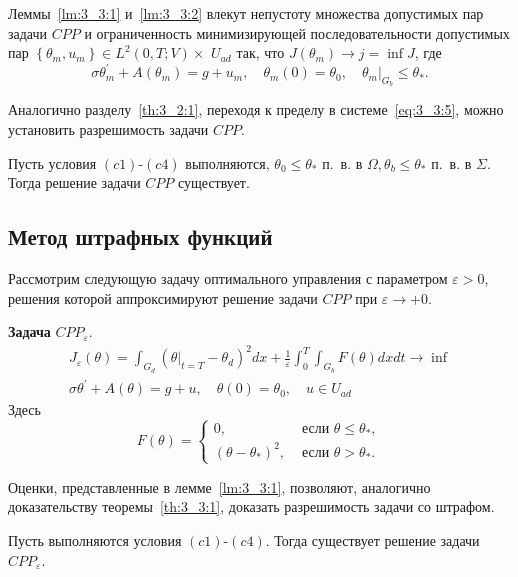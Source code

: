 Леммы~\ref{lm:3_3:1} и~\ref{lm:3_3:2} влекут
непустоту множества допустимых пар задачи $CPP$
и ограниченность минимизирующей последовательности допустимых пар
$\left\{\theta_{m}, u_{m}\right\} \in L^{2}(0, T ; V) \times$
$U_{a d}$ так, что $J\left(\theta_{m}\right) \rightarrow j=\inf J$, где
\begin{equation}
    \label{eq:3_3:5}
    \sigma \theta_{m}^{\prime}+A\left(\theta_{m}\right)=g+u_{m},
    \quad \theta_{m}(0)=\theta_{0},\left.\quad \theta_{m}\right|_{G_{b}} \leq \theta_{*}.
\end{equation}

Аналогично разделу~\ref{th:3_2:1}, переходя к пределу в системе~\eqref{eq:3_3:5},
можно установить разрешимость задачи $CPP$\@.

\begin{theorem}
    \label{th:3_3:1}
    Пусть условия $(c1)$-$(c4)$ выполняются,
    $\theta_{0} \leq \theta_{*}$ п.\ в. в $\Omega, \theta_{b} \leq \theta_{*}$ п.\ в. в $\Sigma$.
    Тогда решение задачи $CPP$ существует.
\end{theorem}

\subsection{Метод штрафных функций}\label{subsec:ch3:sec3:subsec4}
Рассмотрим следующую задачу оптимального управления с параметром $\varepsilon>0$,
решения которой аппроксимируют решение задачи $CPP$ при $\varepsilon \rightarrow+0$.


\textbf{Задача} $CPP_{\varepsilon}$.
\[
    \begin{gathered}
        J_{\varepsilon}(\theta)=\int_{G_{d}}
        \left(\left.\theta\right|_{t=T}
        -\theta_{d}\right)^{2} d x
        + \frac{1}{\varepsilon} \int_{0}^{T} \int_{G_{b}} F(\theta) d x d t \rightarrow \inf \\
        \sigma \theta^{\prime}+A(\theta)=g+u, \quad \theta(0)=\theta_{0}, \quad u \in U_{a d}
    \end{gathered}
\]
Здесь
\[
    F(\theta)=
    \begin{cases}
        0, & \text { если } \theta \leq \theta_{*}, \\
        \left(\theta-\theta_{*}\right)^{2}, & \text { если } \theta>\theta_{*}.
    \end{cases}
\]

Оценки, представленные в лемме~\ref{lm:3_3:1}, позволяют, аналогично
доказательству теоремы~\ref{th:3_3:1}, доказать разрешимость задачи со штрафом.
\begin{theorem}
    \label{th:3_3:2}
    Пусть выполняются условия $(c1)$-$(c4)$.
    Тогда существует решение задачи $CPP_{\varepsilon}$.
\end{theorem}


